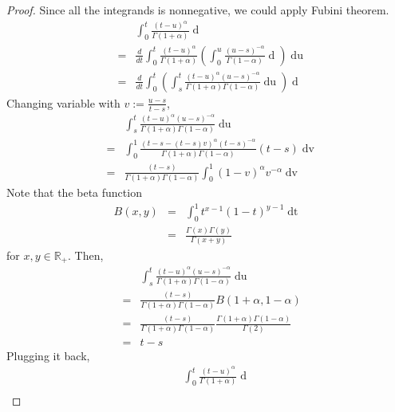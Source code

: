 \documentclass[a4paper, twoside, 11pt]{article}
\theoremstyle{definition}
\newcommand{\brkt}[1]{\left({#1} \right)}
\begin{document}
  \begin{proof}
	Since all the integrands is nonnegative, we could apply Fubini theorem.
  \begin{eqnarray*}
	&&\int_0^t \frac{(t-u)^\alpha}{\Gamma(1+\alpha)}\mathop{dX^{(\alpha)}_u}\\
	&=& \frac{d}{dt}\int_0^t \frac{(t-u)^\alpha}{\Gamma(1+\alpha)} \brkt{ \int_0^u \frac{(u-s)^{-\alpha}}{\Gamma(1-\alpha)}\mathop{dX_s}}\mathop{du}\\
	&=& \frac{d}{dt}\int_{0}^{t} \brkt{\int_s^t \frac{(t-u)^\alpha (u-s)^{-\alpha}}{\Gamma(1+\alpha)\Gamma(1-\alpha)}\mathop{du}} \mathop{dX_s}
  \end{eqnarray*}
  Changing variable with $v:= \frac{u-s}{t-s}$,
  \begin{eqnarray*}
   &&\int_s^t \frac{(t-u)^\alpha (u-s)^{-\alpha}}{\Gamma(1+\alpha)\Gamma(1-\alpha)}\mathop{du}\\
   &=& \int_0^1 \frac{(t-s - (t-s)v)^\alpha (t-s)^{-\alpha}}{\Gamma(1+\alpha)\Gamma(1-\alpha)}(t-s)\mathop{dv}\\
   &=& \frac{(t-s)}{\Gamma(1+\alpha)\Gamma(1-\alpha)}\int_0^1 (1-v)^\alpha v^{-\alpha} \mathop{dv}
  \end{eqnarray*}
Note that the beta function 
\begin{eqnarray*}
  B(x,y) &=& \int_0^1 t^{x-1} (1-t)^{y-1} \mathop{dt}\\
  &=& \frac{\Gamma(x)\Gamma(y)}{\Gamma(x+y)}
\end{eqnarray*}
for $x, y \in \mathbb{R}_+$.
Then,
\begin{eqnarray*}
   &&\int_s^t \frac{(t-u)^\alpha (u-s)^{-\alpha}}{\Gamma(1+\alpha)\Gamma(1-\alpha)}\mathop{du}\\
   &=& \frac{(t-s)}{\Gamma(1+\alpha)\Gamma(1-\alpha)} B(1+\alpha, 1-\alpha)\\
   &=& \frac{(t-s)}{\Gamma(1+\alpha)\Gamma(1-\alpha)} \frac{\Gamma(1+\alpha)\Gamma(1-\alpha)}{\Gamma(2)}\\
   &=& t-s
  \end{eqnarray*}
  Plugging it back,
  \begin{eqnarray*}
	&&\int_0^t \frac{(t-u)^\alpha}{\Gamma(1+\alpha)}\mathop{dX^{(\alpha)}_u}\nonumber\\

\end{eqnarray*}
\end{proof}
\end{document}
